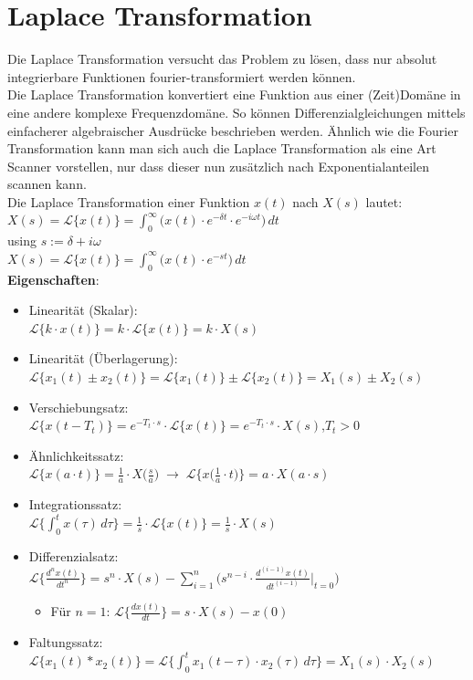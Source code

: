 \documentclass[12pt,a4paper]{article}
\newcommand{\nl}{\\[0.1cm]}
\begin{document}
\section{Laplace Transformation}
Die Laplace Transformation versucht das Problem zu lösen, dass nur absolut integrierbare Funktionen fourier-transformiert werden können.\\
Die Laplace Transformation konvertiert eine Funktion aus einer (Zeit)Domäne in eine andere komplexe Frequenzdomäne. So können Differenzialgleichungen mittels einfacherer algebraischer Ausdrücke beschrieben werden. Ähnlich wie die Fourier Transformation kann man sich auch die Laplace Transformation als eine Art Scanner vorstellen, nur dass dieser nun zusätzlich nach Exponentialanteilen scannen kann.\\
Die Laplace Transformation einer Funktion $x(t)$ nach $X(s)$ lautet:\nl
$\displaystyle X(s) = \mathcal{L}\{x(t)\} = \int_0^\infty \big( x(t) \cdot e^{-\delta t} \cdot e^{-i\omega t} \big) \, dt$\nl
using $s := \delta + i\omega$\nl
$\displaystyle X(s) = \mathcal{L}\{x(t)\} = \int_0^\infty \big( x(t) \cdot e^{-st} \big) \, dt$\nl
\textbf{Eigenschaften}:
\begin{itemize}
\item Linearität (Skalar):\\ $\mathcal{L}\{k\cdot x(t)\} = k\cdot \mathcal{L}\{x(t)\} = k\cdot X(s)$
\item Linearität (Überlagerung):\\ $\mathcal{L}\{x_1(t) \pm x_2(t)\} = \mathcal{L}\{x_1(t)\} \pm \mathcal{L}\{x_2(t)\} = X_1(s) \pm X_2(s)$
\item Verschiebungsatz:\\ $\mathcal{L}\{x(t-T_t)\} = e^{-T_t\cdot s} \cdot \mathcal{L}\{x(t)\} = e^{-T_t\cdot s}\cdot X(s)$,\quad $T_t > 0$
\item Ähnlichkeitssatz:\\ $\mathcal{L}\{x(a\cdot t)\} = \frac{1}{a} \cdot X\big(\frac{s}{a}\big) \; \rightarrow \; \mathcal{L}\{x\big( \frac{1}{a}\cdot t\big)\} = a\cdot X(a\cdot s)$
\item Integrationssatz:\\ $\displaystyle \mathcal{L}\bigg\{\int_0^t x(\tau)\,d\tau \bigg\} = \frac{1}{s}\cdot \mathcal{L}\{x(t)\} = \frac{1}{s} \cdot X(s)$
\item Differenzialsatz:\\ $\displaystyle\mathcal{L}\bigg\{\frac{d^nx(t)}{dt^n}\bigg\} = s^n\cdot X(s) - \sum_{i=1}^n \bigg(s^{n-i}\cdot \frac{d^{(i-1)}x(t)}{dt^{(i-1)}}\bigg\vert_{t=0}\bigg)$
\begin{itemize}
\item Für $n=1$: $\mathcal{L}\big\{\frac{dx(t)}{dt}\big\} = s\cdot X(s)-x(0)$
\end{itemize}
\item Faltungssatz:\\ $\displaystyle\mathcal{L}\{x_1(t)\ast x_2(t)\} = \mathcal{L}\bigg\{\int_0^t x_1(t-\tau)\cdot x_2(\tau) \, d\tau\bigg\} = X_1(s) \cdot X_2(s)$
\end{itemize}
\end{document}
